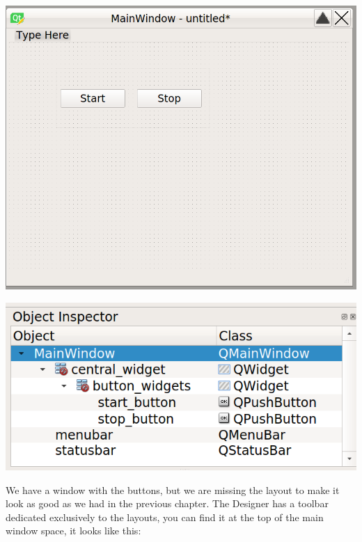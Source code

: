 \begin{minipage}{0.45\linewidth}
    \centering
    \includegraphics[width=\textwidth]{images/Chapter_09/05_main_window_buttons.png}
\end{minipage}
\hspace{0.5cm}
\begin{minipage}{0.45\linewidth}
    \centering
    \includegraphics[width=\textwidth]{images/Chapter_09/05_main_window_structure.png}
\end{minipage}


We have a window with the buttons, but we are missing the layout to make it look as good as we had in the previous chapter. The Designer has a toolbar dedicated exclusively to the layouts, you can find it at the top of the main window space, it looks like this:

